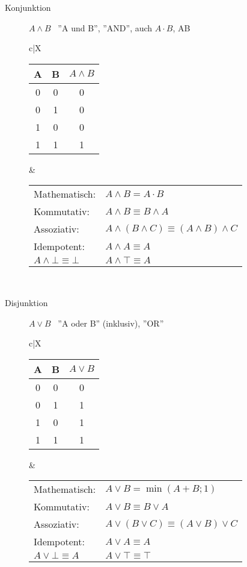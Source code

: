 \documentclass[12pt,a4paper]{article}
\begin{document}
\begin{description}
\begin{description}
			\item[Konjunktion] $A\wedge B$ \, ''A und B'', ''AND'', auch $A\cdot B$, AB \\
				\begin{tabularx}{\linewidth}{c|X}
					\begin{tabular}[t]{c|c||c}
						A & B & $A \wedge B$ \\ \hline\hline
						0 & 0 & 0            \\ \hline
						0 & 1 & 0            \\ \hline
						1 & 0 & 0            \\ \hline
						1 & 1 & 1
					\end{tabular} &
					\begin{tabular}[t]{ll}
						Mathematisch:               & $A \wedge B = A \cdot B$                             \\
						Kommutativ:                 & $A \wedge B \equiv B \wedge A$                       \\
						Assoziativ:                 & $A \wedge (B \wedge C) \equiv (A \wedge B) \wedge C$ \\
						Idempotent:                 & $A \wedge A \equiv A$                                \\
						$A \wedge \bot \equiv \bot$ & $A \wedge \top \equiv A$
					\end{tabular} \\ \hline
				\end{tabularx}

			\item[Disjunktion] $A\vee B$ \, ''A oder B'' (inklusiv), ''OR'' \\
				\begin{tabularx}{\linewidth}{c|X}
					\begin{tabular}[t]{c|c||c}
						A & B & $A \vee B$ \\ \hline\hline
						0 & 0 & 0          \\ \hline
						0 & 1 & 1          \\ \hline
						1 & 0 & 1          \\ \hline
						1 & 1 & 1
					\end{tabular} &
					\begin{tabular}[t]{ll}
						Mathematisch:           & $A \vee B = \min(A+B;1)$                     \\
						Kommutativ:             & $A \vee B \equiv B \vee A$                   \\
						Assoziativ:             & $A \vee (B \vee C) \equiv (A \vee B) \vee C$ \\
						Idempotent:             & $A \vee A \equiv A$                          \\
						$A \vee \bot \equiv A $ & $A \vee \top \equiv \top$
					\end{tabular} \\ \hline
				\end{tabularx}


\end{description}
\end{description}
\end{document}
